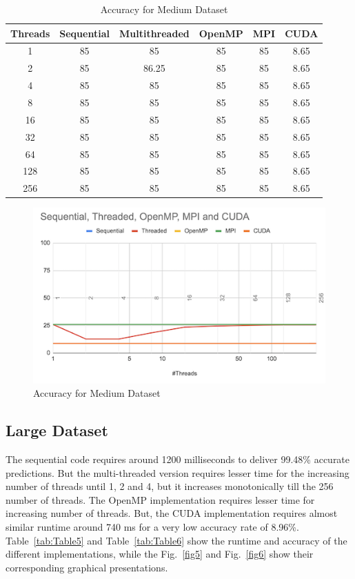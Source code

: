 \documentclass[conference]{IEEEtran}
\begin{document}
\begin{table}
    \begin{tabular}{||c | c | c | c | c | c||} 
    \hline
    Threads & Sequential & Multithreaded & OpenMP & MPI & CUDA \\ [0.2ex] 
    \hline\hline
    1 & 85 & 85 & 85 & 85 & 8.65\\ [1ex] 
    \hline
    2 & 85 & 86.25 & 85 & 85 & 8.65\\ [1ex] 
    \hline
    4 & 85 & 85 & 85 & 85 & 8.65\\ [1ex] 
    \hline
    8 & 85 & 85 & 85 & 85 & 8.65\\ [1ex] 
    \hline
    16 & 85 & 85 & 85 & 85 & 8.65\\ [1ex] 
     \hline
    32 & 85 & 85 & 85 & 85 & 8.65\\ [1ex] 
     \hline
    64 & 85 & 85 & 85 & 85 & 8.65\\ [1ex] 
     \hline
    128 & 85 & 85 & 85 & 85 & 8.65\\ [1ex] 
     \hline
    256 & 85 & 85 & 85 & 85 & 8.65\\ [1ex] 
     \hline
    \end{tabular}
\caption{\label{tab:Table4}Accuracy for Medium Dataset}
\end{table}

\begin{figure}[htbp]
    \centerline{\includegraphics{report/acc_medium_set.png}}
    \caption{Accuracy for Medium Dataset}
    \label{fig4}
\end{figure}

\subsection{Large Dataset}
The sequential code requires around 1200 milliseconds to deliver 99.48\% accurate predictions. But the multi-threaded version requires lesser time for the increasing number of threads until 1, 2 and 4, but it increases monotonically till the 256 number of threads. The OpenMP implementation requires lesser time for increasing number of threads. But, the CUDA implementation requires almost similar runtime around 740 ms for a very low accuracy rate of 8.96\%. 
Table~\ref{tab:Table5} and Table~\ref{tab:Table6} show the runtime and accuracy of the different implementations, while the Fig.~\ref{fig5} and Fig.~\ref{fig6} show their corresponding graphical presentations.
\end{document}

